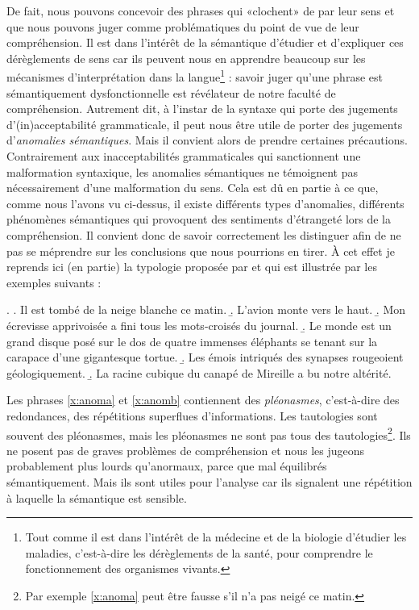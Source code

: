 \begin{refsegment}
De fait, nous pouvons concevoir des phrases qui «clochent» de par leur sens et que nous pouvons juger comme problématiques du point de vue de leur compréhension.  Il est dans l'intérêt de la sémantique d'étudier et d'expliquer ces dérèglements de sens car ils peuvent nous en apprendre beaucoup sur les mécanismes d'interprétation dans la langue\footnote{Tout comme il est dans l'intérêt de la médecine et de la biologie d'étudier les maladies, c'est-à-dire les dérèglements de la santé, pour comprendre le fonctionnement des organismes vivants.} : savoir juger qu'une phrase est sémantiquement dysfonctionnelle est révélateur de notre faculté de compréhension.
Autrement dit, à l'instar de la syntaxe qui porte des jugements d'(in)acceptabilité grammaticale, il peut nous être utile de porter des jugements d'\emph{anomalies sémantiques}.  Mais il convient alors de prendre certaines précautions.  Contrairement aux inacceptabilités grammaticales qui sanctionnent une malformation syntaxique, les anomalies sémantiques ne témoignent pas nécessairement d'une malformation du sens.  
Cela est dû en partie à ce que, comme nous l'avons vu ci-dessus, il existe différents types d'anomalies, différents phénomènes sémantiques qui provoquent des sentiments d'étrangeté lors de la compréhension.  Il convient donc de savoir correctement les distinguer afin de ne pas se méprendre sur les conclusions que nous pourrions en tirer.  À cet effet je reprends ici (en partie) la typologie proposée par \citet[10--14]{Cruse:86} et qui est illustrée par les exemples suivants :

\ex. \label{x:anom}
\a. Il est tombé de la neige blanche ce matin.  \label{x:anoma}
\b. L'avion monte vers le haut.  \label{x:anomb}
\b. Mon écrevisse apprivoisée a fini tous les mots-croisés du journal.  \label{x:anomc}
\b. Le monde est un grand disque posé sur le dos de quatre immenses éléphants se tenant sur la carapace d'une gigantesque tortue.   \label{x:anomd}
\b. Les émois intriqués des synapses rougeoient géologiquement.  \label{x:anome}
\b. La racine cubique du canapé de Mireille a bu notre altérité. \label{x:anomf} 


Les phrases \ref{x:anoma} et \ref{x:anomb} contiennent des \emph{pléonasmes}, c'est-à-dire des redondances, des répétitions superflues d'informations.  Les tautologies sont souvent des pléonasmes, mais les pléonasmes ne sont pas tous des tautologies\footnote{Par exemple \ref{x:anoma} peut être fausse s'il n'a pas neigé ce matin.}.
Ils ne posent pas de graves problèmes de compréhension et nous les jugeons probablement plus lourds qu'anormaux, parce que mal équilibrés sémantiquement.  Mais ils sont utiles pour l'analyse car ils signalent une répétition à laquelle la sémantique est sensible.


\end{refsegment}
